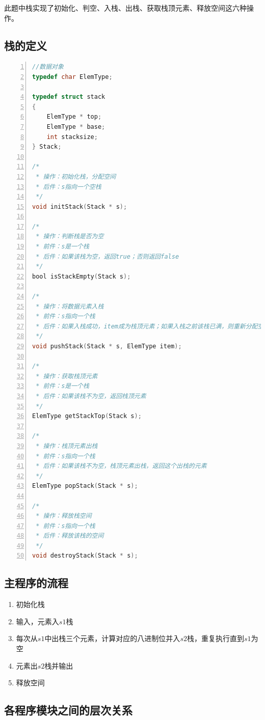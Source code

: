 \documentclass{article}
\begin{document}
此题中栈实现了初始化、判空、入栈、出栈、获取栈顶元素、释放空间这六种操作。

\subsection{栈的定义}

\begin{lstlisting}[language={C},
    numbers=left,
    numberstyle=\tiny\consolas,
    basicstyle=\small\consolas]
//数据对象
typedef char ElemType;

typedef struct stack
{
    ElemType * top;
    ElemType * base;
    int stacksize;
} Stack;

/*
 * 操作：初始化栈，分配空间
 * 后件：s指向一个空栈
 */
void initStack(Stack * s);

/*
 * 操作：判断栈是否为空
 * 前件：s是一个栈
 * 后件：如果该栈为空，返回true；否则返回false
 */
bool isStackEmpty(Stack s);

/*
 * 操作：将数据元素入栈
 * 前件：s指向一个栈
 * 后件：如果入栈成功，item成为栈顶元素；如果入栈之前该栈已满，则重新分配空间
 */
void pushStack(Stack * s, ElemType item);

/*
 * 操作：获取栈顶元素
 * 前件：s是一个栈
 * 后件：如果该栈不为空，返回栈顶元素
 */
ElemType getStackTop(Stack s);

/*
 * 操作：栈顶元素出栈
 * 前件：s指向一个栈
 * 后件：如果该栈不为空，栈顶元素出栈，返回这个出栈的元素
 */
ElemType popStack(Stack * s);

/*
 * 操作：释放栈空间
 * 前件：s指向一个栈
 * 后件：释放该栈的空间
 */
void destroyStack(Stack * s);
\end{lstlisting}

\subsection{主程序的流程}

\begin{enumerate}
    \item 初始化栈
    \item 输入，元素入$s1$栈
    \item 每次从$s1$中出栈三个元素，计算对应的八进制位并入$s2$栈，重复执行直到$s1$为空
    \item 元素出$s2$栈并输出
    \item 释放空间
\end{enumerate}

\subsection{各程序模块之间的层次关系}
\end{document}
